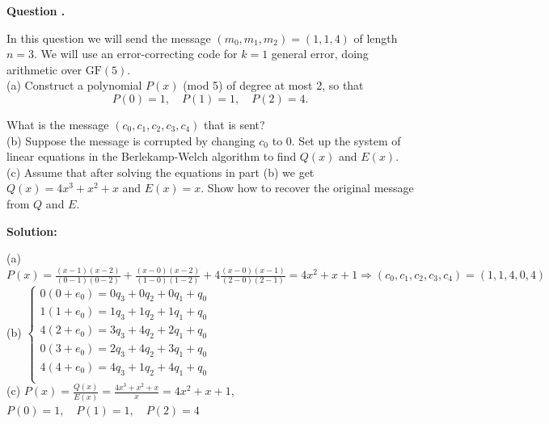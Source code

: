 \documentclass[12pt]{article}
\newcounter{questionnumber}
\newenvironment{question}[1][]{\stepcounter{questionnumber}\par\noindent\textbf{Question \thequestionnumber. #1}\par}{\par}
\newenvironment{solution}{\par\noindent\textbf{Solution:}\par}{\par\vspace{1em}}
\begin{document}
\begin{question}
    In this question we will send the message $(m_{0},m_{1},m_{2})=(1,1,4)$ of length $n=3$. We will use an error-correcting code for $k=1$ general error, doing arithmetic over $\mathrm{GF}(5)$.\\
    (a) Construct a polynomial $P(x)$ (mod 5) of degree at most 2, so that
    $$P(0)=1, \quad P(1)=1, \quad P(2)=4.$$

    What is the message $(c_{0},c_{1},c_{2},c_{3},c_{4})$ that is sent?\\
    (b) Suppose the message is corrupted by changing $c_{0}$ to 0. Set up the system of linear equations in the Berlekamp-Welch algorithm to find $Q(x)$ and $E(x)$.\\
    (c) Assume that after solving the equations in part (b) we get $Q(x)=4x^{3}+x^{2}+x$ and $E(x)=x$. Show how to recover the original message from $Q$ and $E$.
\end{question}
\begin{solution}
    \noindent
    (a) $P\left( x \right) =\frac{\left( x-1 \right) \left( x-2 \right)}{\left( 0-1 \right) \left( 0-2 \right)}+\frac{\left( x-0 \right) \left( x-2 \right)}{\left( 1-0 \right) \left( 1-2 \right)}+4\frac{\left( x-0 \right) \left( x-1 \right)}{\left( 2-0 \right) \left( 2-1 \right)}=4x^2+x+1\Longrightarrow \left( c_0,c_1,c_2,c_3,c_4 \right) =\left( 1,1,4,0,4 \right) $\\
    (b) $\begin{cases}
            0\left( 0+e_0 \right) =0q_3+0q_2+0q_1+q_0\\
            1\left( 1+e_0 \right) =1q_3+1q_2+1q_1+q_0\\
            4\left( 2+e_0 \right) =3q_3+4q_2+2q_1+q_0\\
            0\left( 3+e_0 \right) =2q_3+4q_2+3q_1+q_0\\
            4\left( 4+e_0 \right) =4q_3+1q_2+4q_1+q_0\\
        \end{cases}$\\
    (c) $P\left( x \right) =\frac{Q\left( x \right)}{E\left( x \right)}=\frac{4x^3+x^2+x}{x}=4x^2+x+1$, $P(0)=1, \quad P(1)=1, \quad P(2)=4$
\end{solution}
\end{document}
